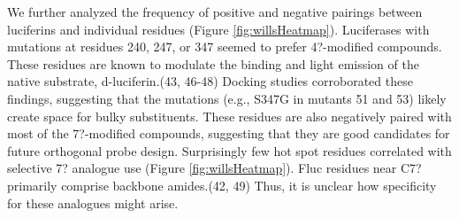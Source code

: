 We further analyzed the frequency of positive and negative pairings between luciferins and individual residues (Figure \ref{fig:willsHeatmap}). Luciferases with mutations at residues 240, 247, or 347 seemed to prefer 4?-modified compounds. These residues are known to modulate the binding and light emission of the native substrate, d-luciferin.\cite{Harwood:2011gl,Branchini:2003kt,Branchini:2007bw,Viviani:2013cj}(43, 46-48) Docking studies corroborated these findings, suggesting that the mutations (e.g., S347G in mutants 51 and 53) likely create space for bulky substituents.
These residues are also negatively paired with most of the 7?-modified compounds, suggesting that they are good candidates for future orthogonal probe design. Surprisingly few hot spot residues correlated with selective 7? analogue use (Figure \ref{fig:willsHeatmap}). Fluc residues near C7? primarily comprise backbone amides.\cite{Sundlov:2012kn,Viviani:2013ej}(42, 49) Thus, it is unclear how specificity for these analogues might arise.

